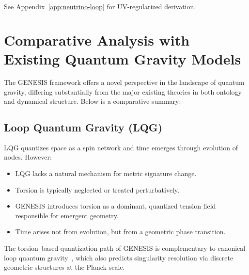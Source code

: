 \documentclass{article}
\begin{document}
See Appendix~\ref{app:neutrino-loop} for UV-regularized derivation.






\section{Comparative Analysis with Existing Quantum Gravity Models} \label{sec:comparison} 
The GENESIS framework offers a novel perspective in the landscape of quantum gravity, differing substantially from the major existing theories in both ontology and dynamical structure. Below is a comparative summary:

\subsection{Loop Quantum Gravity (LQG)} LQG quantizes space as a spin network and time emerges through evolution of nodes. However: \begin{itemize} \item LQG lacks a natural mechanism for metric signature change. \item Torsion is typically neglected or treated perturbatively. \item GENESIS introduces torsion as a dominant, quantized tension field responsible for emergent geometry. \item Time arises not from evolution, but from a geometric phase transition. \end{itemize}

The torsion–based quantization path of GENESIS is complementary to canonical loop quantum gravity~\cite{ashtekar2022,rovelli2004,thiemann2007}, which also predicts singularity resolution via discrete geometric structures at the Planck scale.


\medskip
\begin{center}
\end{center}
\medskip
\end{document}
